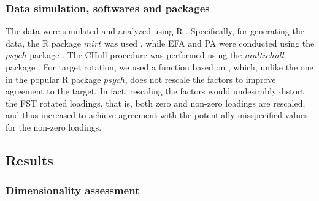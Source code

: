 \documentclass[a4paper,man,natbib]{apa6}
\begin{document}
\begin{linenumbers}
\subsubsection{Data simulation, softwares and packages}
The data were simulated and analyzed using R \citep{team2013r}. Specifically, for generating the data, the R package $mirt$ was used \citep{mirt2012}, while EFA and PA were conducted using the $psych$ package \citep{revelle2015package}. The CHull procedure was performed using the $multichull$ package \citep{vervloet2017multichull}. For target rotation, we used a function based on \citet{jennrich2002simple}, which, unlike the one in the popular R package $psych$, does not rescale the factors to improve agreement to the target. In fact, rescaling the factors would undesirably distort the FST rotated loadings, that is, both zero and non-zero loadings are rescaled, and thus increased to achieve agreement with the potentially misspecified values for the non-zero loadings.

\subsection{Results}
\subsubsection{Dimensionality assessment}


\end{linenumbers}
\end{document}
